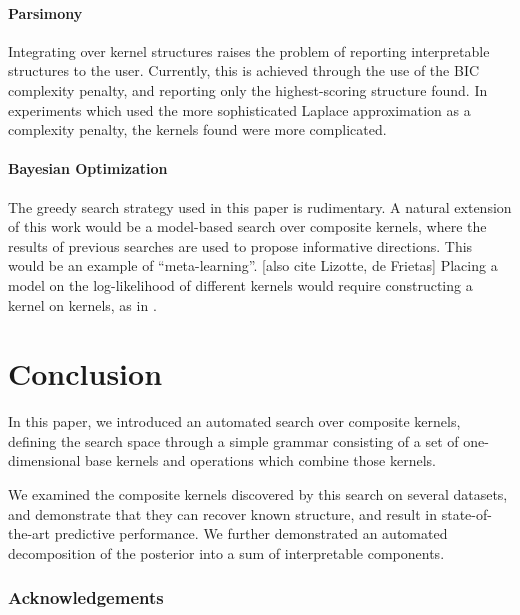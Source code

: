 \documentclass[twoside]{article}
\begin{document}
\paragraph{Parsimony}
Integrating over kernel structures raises the problem of reporting interpretable structures to the user.
Currently, this is achieved through the use of the BIC complexity penalty, and reporting only the highest-scoring structure found.
In experiments which used the more sophisticated Laplace approximation as a complexity penalty, the kernels found were more complicated.

\paragraph{Bayesian Optimization} 
The greedy search strategy used in this paper is rudimentary.  A natural extension of this work would be a model-based search over composite kernels, where the results of previous searches are used to propose informative directions.  This would be an example of ``meta-learning''.
\cite{snoek2012practical} [also cite Lizotte, de Frietas]
%
Placing a \gp{} model on the log-likelihood of different kernels would require constructing a kernel on kernels, as in \cite{ong2002hyperkernels}.

\section{Conclusion}

In this paper, we introduced an automated search over composite kernels, defining the search space through a simple grammar consisting of a set of one-dimensional base kernels and operations which combine those kernels.

We examined the composite kernels discovered by this search on several datasets, and demonstrate that they can recover known structure, and result in state-of-the-art predictive performance.  We further demonstrated an automated decomposition of the posterior into a sum of interpretable components.

\subsubsection*{Acknowledgements}



\end{document}
